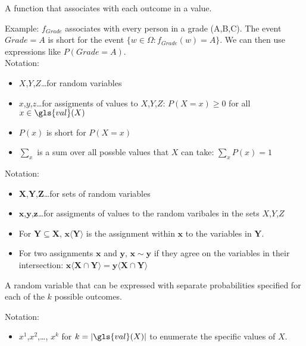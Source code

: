 {%
  A function that associates with each outcome in  a value.

  Example: $f_{Grade}$ associates with every person in  a grade (A,B,C). The event $Grade=A$ is short for the event $\{w\in\Omega:f_{Grade}(w)=A\}$. We can then use expressions like $P(Grade=A)$.\\

  Notation:
  \begin{itemize}
    \item $X$,$Y$,$Z$\dots for random variables
    \item $x$,$y$,$z$\dots for assigments of values to  $X$,$Y$,$Z$: $P(X=x)\geq0 $ for all $x\in \gls{val}(X)$
    \item $P(x)$ is short for $P(X=x)$
    \item $\sum_x$ is a sum over all possble values that $X$ can take: $\sum_{x}P(x)=1$
  \end{itemize}
}

{%
  Notation:
  \begin{itemize}
    \item $\bm{X}$,$\bm{Y}$,$\bm{Z}$\dots for sets of \glspl{random variable}
    \item $\bm{x}$,$\bm{y}$,$\bm{z}$\dots for assigments of values to the random varibales in the sets $X$,$Y$,$Z$
    \item For $\bm{Y}\subseteq \bm{X}$, $\bm{x}\langle \bm{Y}\rangle$ is the assignment within $\bm{x}$ to the variables in $\bm{Y}$.
    \item For two assignments $\bm{x}$ and $\bm{y}$, $\bm{x}\sim \bm{y}$ if they agree on the variables in their intersection: $\bm{x}\langle\bm{X}\cap\bm{Y}\rangle=\bm{y}\langle\bm{X}\cap\bm{Y}\rangle$
  \end{itemize}
}

{%
  A \gls{random variable} that can be expressed with separate probabilities specified for each of the $k$ possible outcomes.

  Notation:
  \begin{itemize}
    \item $x^1$,$x^2$,\ldots, $x^k$ for $k=\lvert\gls{val}(X)\rvert$ to enumerate the specific values of $X$.
  \end{itemize}
}

